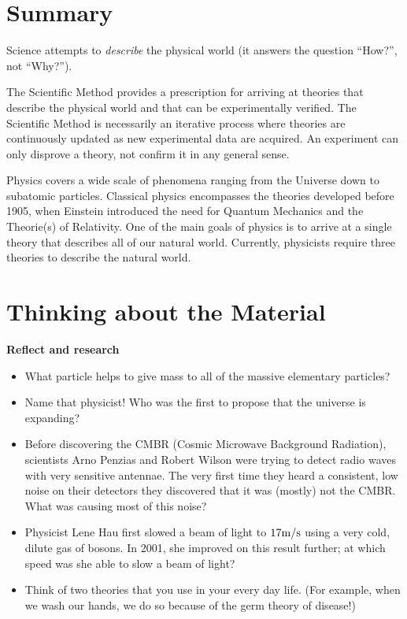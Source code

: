 \documentclass[9pt,Preprint]{lapreprint}
\begin{document}
\section{Summary}

Science attempts to \textit{describe} the physical world (it answers the question ``How?'', not ``Why?'').

The Scientific Method provides a prescription for arriving at theories that describe the physical world and that can be experimentally verified. The Scientific Method is necessarily an iterative process where theories are continuously updated as new experimental data are acquired. An experiment can only disprove a theory, not confirm it in any general sense.

Physics covers a wide scale of phenomena ranging from the Universe down to subatomic particles. Classical physics encompasses the theories developed before 1905, when Einstein introduced the need for Quantum Mechanics and the Theorie(s) of Relativity. One of the main goals of physics is to arrive at a single theory that describes all of our natural world. Currently, physicists require three theories to describe the natural world.

\section{Thinking about the Material}

\begin{framed}
\textbf{Reflect and research}\\
\begin{itemize}
\item What particle helps to give mass to all of the massive elementary particles?
\item Name that physicist! Who was the first to propose that the universe is expanding?
\item Before discovering the CMBR (Cosmic Microwave Background Radiation), scientists Arno Penzias and Robert Wilson were trying to detect radio waves with very sensitive antennae. The very first time they heard a consistent, low noise on their detectors they discovered that it was (mostly) not the CMBR. What was causing most of this noise?
\item Physicist Lene Hau first slowed a beam of light to $17 {\rm m/s}$ using a very cold, dilute gas of bosons. In 2001, she improved on this result further; at which speed was she able to slow a beam of light?
\item Think of two theories that you use in your every day life. (For example, when we wash our hands, we do so because of the germ theory of disease!)
\end{itemize}
\end{framed}
\end{document}
